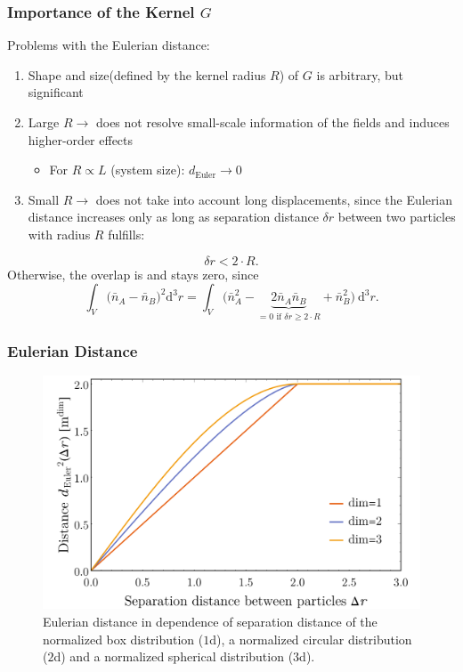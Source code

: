 \documentclass[9pt, english]{beamer}
\renewcommand{\d}{\mathrm{d}}
\begin{document}
\begin{frame}[fragile]
\frametitle{Importance of the Kernel \(G\)}
Problems with the Eulerian distance:
\begin{enumerate}
 \item Shape and size(defined by the kernel radius \(R\)) of \(G\) is arbitrary, but significant
 \item Large \(R \rightarrow\) does not resolve small-scale information of the fields and induces higher-order effects
 \begin{itemize}
  \item For \(R \propto L\) (system size): \(d_{\text{Euler}} \rightarrow 0\)
 \end{itemize}
 \item Small \(R \rightarrow\) does not take into account long displacements,
       since the Eulerian distance increases only as long as separation distance \(\delta r\) between two particles with radius \(R\) fulfills:
\end{enumerate}
\begin{equation}
 \delta r < 2 \cdot R.
\end{equation}
Otherwise, the overlap is and stays zero, since
\begin{equation}
 \int_V{\big(\bar{n}_A-\bar{n}_B\big)^2 \d^3 r} = \int_V{\big(\bar{n}_A^2-\underbrace{2\bar{n}_A\bar{n}_B}_{= 0 \text{ if } \delta r \geq 2 \cdot R}+\bar{n}_B^2\big) \: \d^3 r}.
\end{equation}
\end{frame}

\begin{frame}[fragile]
\frametitle{Eulerian Distance}
\begin{figure}
\centering
\includegraphics[width=.85\textwidth]{box_filter_distance.png}
\caption{Eulerian distance in dependence of separation distance of
the normalized box distribution (\(1\)d),
a normalized circular distribution (\(2\)d) and
a normalized spherical distribution (\(3\)d).}
\end{figure}
\end{frame}
\end{document}
